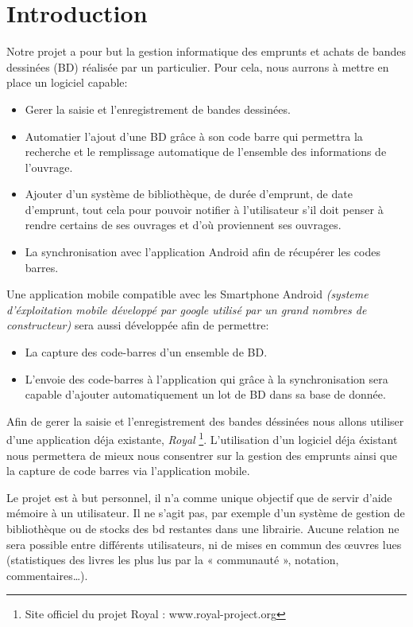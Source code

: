 \part*{Introduction}
Notre projet a pour but la gestion informatique des emprunts et achats de bandes dessinées (BD) réalisée par un particulier.
Pour cela, nous aurrons à mettre en place un logiciel capable: 
\begin{itemize}
\item Gerer la saisie et l'enregistrement de bandes dessinées.
\item Automatier l'ajout d'une BD grâce à son code barre qui permettra la recherche et le remplissage automatique de l'ensemble des informations de l'ouvrage.
\item Ajouter d'un système de bibliothèque, de durée d'emprunt, de date d'emprunt, tout cela pour pouvoir notifier à l'utilisateur s'il doit penser à rendre certains de ses ouvrages et d'où proviennent ses ouvrages.
\item La synchronisation avec l'application Android afin de récupérer les codes barres.
\end{itemize}

Une application mobile compatible avec les Smartphone Android \textit{(systeme d'éxploitation mobile développé par google utilisé par un grand nombres de constructeur)} sera aussi développée afin de permettre:
\begin{itemize}
\item La capture des code-barres d'un ensemble de BD.
\item L'envoie des code-barres à l'application qui grâce à la synchronisation sera capable d'ajouter automatiquement un lot de BD dans sa base de donnée.
\end{itemize}

Afin de gerer la saisie et l'enregistrement des bandes déssinées nous allons utiliser d'une application déja existante, 
\emph{Royal} \footnote{Site officiel du projet Royal : www.royal-project.org}. 
L'utilisation d'un logiciel déja éxistant nous permettera de mieux nous consentrer sur la gestion des emprunts ainsi que la capture de code barres via l'application mobile.

Le projet est à but personnel, il n'a comme unique objectif que de servir d'aide mémoire à un utilisateur.
Il ne s'agit pas, par exemple d'un système de gestion de bibliothèque ou de stocks des bd restantes dans une librairie.
Aucune relation ne sera possible entre différents utilisateurs, ni de mises en commun des œuvres lues
(statistiques des livres les plus lus par la « communauté », notation, commentaires…).

